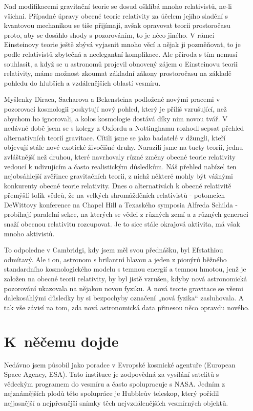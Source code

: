   Nad modifikacemi gravitační teorie se dosud ošklíbá mnoho relativistů, ne-li všichni. Případné
  úpravy obecné teorie relativity za účelem jejího sladění s kvantovou mechanikou se tiše přijímají,
  avšak opravovat teorii prostoročasu proto, aby se dosáhlo shody s pozorováním, to je něco jiného.
  V rámci Einsteinovy teorie ještě zbývá vyjasnit mnoho věcí a nějak ji pozměňovat, to je podle
  relativistů zbytečná a neelegantní komplikace. Ale příroda s tím nemusí souhlasit, a když se u
  astronomů projevil obnovený zájem o Einsteinovu teorii relativity, máme možnost zkoumat základní
  zákony prostoročasu na základě pohledu do hlubších a vzdálenějších oblastí vesmíru. 
  
  Myšlenky Diraca, Sacharova a Bekensteina podložené novými pracemi v pozorovací kosmologii
  poskytují nový pohled, který je příliš vzrušující, než abychom ho ignorovali, a kolos kosmologie
  dostává díky nim novou tvář. V nedávné době jsem se s kolegy z Oxfordu a Nottinghamu rozhodl
  sepsat přehled alternativních teorií gravitace. Cítili jsme se jako badatelé v džungli, kteří
  objevují stále nové exotické živočišné druhy. Narazili jsme na tucty teorií, jednu zvláštnější než
  druhou, které navrhovaly různé změny obecné teorie relativity vedoucí k udivujícím a často
  realistickým důsledkům. Náš přehled nabízel ten nejobsáhlejší zvěřinec gravitačních teorií, z
  nichž některé mohly být vážnými konkurenty obecné teorie relativity. Dnes o alternativách k obecné
  relativitě přemýšlí tolik vědců, že na velkých shromážděních relativistů - potomcích DeWittovy
  konference na Chapel Hill a Texaského symposia Alfreda Schilda - probíhají paralelní sekce, na
  kterých se vědci z různých zemí a z různých generací snaží obecnou relativitu rozcupovat. Je to
  sice stále okrajová aktivita, má však mnoho aktivistů. 
  
  To odpoledne v Cambridgi, kdy jsem měl svou přednášku, byl Efstathiou odmítavý. Ale i on, astronom
  s brilantní hlavou a jeden z pionýrů běžného standardního kosmologického modelu s temnou energií a
  temnou hmotou, jenž je založen na obecné teorii relativity, by byl jistě vzrušen, kdyby nová
  astronomická pozorování ukazovala na nějakou novou fyziku. A nová teorie gravitace se všemi
  dalekosáhlými důsledky by si bezpochyby označení „nová fyzika“ zasluhovala. A tak vše závisí na
  tom, zda nová astronomická data přinesou něco opravdu nového.

\section{K něčemu dojde}\label{kulIchIIIsecXV}
  Nedávno jsem působil jako poradce v Evropské kosmické agentuře (European Space Agency, ESA). Tato
  instituce je zodpovědná za vysílání satelitů s vědeckým programem do vesmíru a často spolupracuje
  s NASA. Jedním z nejznámějších plodů této spolupráce je Hubbleův teleskop, který pořídil
  nejjasnější a nejpřesnější snímky těch nejvzdálenějších vesmírných objektů. 
  
